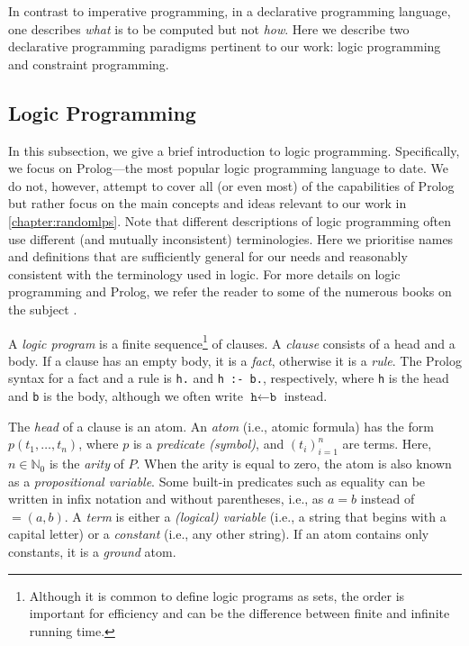 In contrast to imperative programming, in a declarative programming language,
one describes \emph{what} is to be computed but not \emph{how}. Here we describe
two declarative programming paradigms pertinent to our work: logic programming
and constraint programming.

\subsection{Logic Programming}\label{sec:lp}

In this subsection, we give a brief introduction to logic programming.
Specifically, we focus on Prolog---the most popular logic programming language
to date. We do not, however, attempt to cover all (or even most) of the
capabilities of Prolog but rather focus on the main concepts and ideas relevant
to our work in \cref{chapter:randomlps}. Note that different descriptions of
logic programming often use different (and mutually inconsistent) terminologies.
Here we prioritise names and definitions that are sufficiently general for our
needs and reasonably consistent with the terminology used in logic. For more
details on logic programming and Prolog, we refer the reader to some of the
numerous books on the subject
\citep{DBLP:books/daglib/0041598,DBLP:books/daglib/0067951}.

A \emph{logic program} is a finite sequence\footnote{Although it is common to
  define logic programs as sets, the order is important for efficiency and can
  be the difference between finite and infinite running time.} of clauses. A
\emph{clause} consists of a head and a body. If a clause has an empty body, it
is a \emph{fact}, otherwise it is a \emph{rule}. The Prolog syntax for a fact
and a rule is \verb+h.+ and \verb+h :- b.+, respectively, where \texttt{h} is
the head and \texttt{b} is the body, although we often write
$\texttt{h} \gets \texttt{b}$ instead.

The \emph{head} of a clause is an atom. An \emph{atom} (i.e., atomic formula)
has the form $p(t_1, \dots, t_n)$, where $p$ is a \emph{predicate (symbol)}, and
$(t_i)_{i=1}^n$ are terms. Here, $n \in \mathbb{N}_0$ is the \emph{arity} of
$P$. When the arity is equal to zero, the atom is also known as a
\emph{propositional variable}. Some built-in predicates such as equality can be
written in infix notation and without parentheses, i.e., as $a = b$ instead of
$=(a, b)$. A \emph{term} is either a \emph{(logical) variable} (i.e., a string
that begins with a capital letter) or a \emph{constant} (i.e., any other
string). If an atom contains only constants, it is a \emph{ground} atom.

